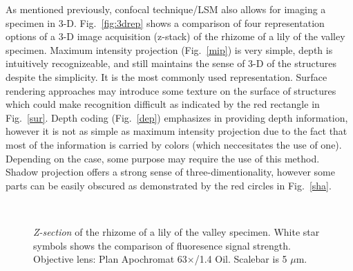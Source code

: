 As mentioned previously, confocal technique/LSM also allows for imaging a specimen in 3-D. 
Fig.~\ref{fig:3drep} shows a comparison of four representation options of a 3-D image acquisition (z-stack) of the rhizome of a lily of the valley specimen. 
Maximum intensity projection (Fig.~\ref{mip}) is very simple, depth is intuitively recognizeable, and still maintains the sense of 3-D of the structures despite the simplicity. 
It is the most commonly used representation. 
Surface rendering approaches may introduce some texture on the surface of structures which could make recognition difficult as indicated by the red rectangle in Fig.~\ref{sur}. 
Depth coding (Fig.~\ref{dep}) emphasizes in providing depth information, however it is not as simple as maximum intensity projection due to the fact that most of the information is carried by colors (which neccesitates the use of one). 
Depending on the case, some purpose may require the use of this method. Shadow projection offers a strong sense of three-dimentionality, however some parts can be easily obscured as demonstrated by the red circles in Fig.~\ref{sha}. 

\begin{figure}[h!]
\centering
{}\hspace{0.1em}
\hspace{0.1em}
\\
\caption{\textit{Z-section} of the rhizome of a lily of the valley specimen. 
White star symbols shows the comparison of fluoresence signal strength. 
Objective lens: Plan Apochromat 63$\times$/1.4 Oil. 
Scalebar is 5 $\mu$m.} 
\label{fig:zstep}
\end{figure}

